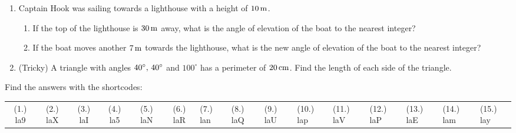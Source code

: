 \begin{enumerate}[noitemsep, label=\textbf{\arabic*}. ]
\begin{enumerate}[noitemsep, label=\textbf{\alph*}. ]
\end{enumerate}
                \label{m39414*uid116}\item Captain Hook was sailing towards a lighthouse with a height of \begin{math}10\phantom{\rule{0.166667em}{0ex}}\mathrm{m}\end{math}.
\label{m39414*id93025}\begin{enumerate}[noitemsep, label=\textbf{\alph*}. ] 
            \label{m39414*uid117}\item If the top of the lighthouse is \begin{math}30\phantom{\rule{0.166667em}{0ex}}\mathrm{m}\end{math} away, what is the angle of elevation of the boat to the nearest integer?
\label{m39414*uid118}\item If the boat moves another \begin{math}7\phantom{\rule{0.166667em}{0ex}}\mathrm{m}\end{math} towards the lighthouse, what is the new angle of elevation of the boat to the nearest integer?
\end{enumerate}
                \label{m39414*uid119}\item (Tricky) A triangle with angles \begin{math}{40}^{\circ },\phantom{\rule{0.166667em}{0ex}}{40}^{\circ }\end{math} and \begin{math}{100}^{\circ }\end{math} has a perimeter of \begin{math}20\phantom{\rule{0.166667em}{0ex}}\mathrm{cm}\end{math}. Find the length of each side of the triangle.\newline
\end{enumerate}
  \label{m39414**end}
  \label{fbcda86bdf0258b6e91dcea5caee5b76**end}
\par {} Find the answers with the shortcodes:
 \par \begin{tabular}[h]{cccccc}
 (1.) la9  &  (2.) laX  &  (3.) laI  &  (4.) la5  &  (5.) laN  &  (6.) laR  &  (7.) lan  &  (8.) laQ  &  (9.) laU  &  (10.) lap  &  (11.) laV  &  (12.) laP  &  (13.) laE  &  (14.) lam  &  (15.) lay  & \end{tabular}
